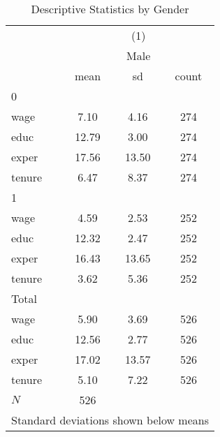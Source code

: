 \begin{table}[htbp]\centering
\def\sym#1{\ifmmode^{#1}\else\(^{#1}\)\fi}
\caption{Descriptive Statistics by Gender}\label{tab:0201-descriptives_by_gender}
\begin{tabular}{l*{1}{ccc}}
\toprule
            &\multicolumn{3}{c}{(1)}               \\
            &\multicolumn{3}{c}{Male}              \\
            &        mean&          sd&       count\\
\midrule
0           &            &            &            \\
wage        &        7.10&        4.16&         274\\
educ        &       12.79&        3.00&         274\\
exper       &       17.56&       13.50&         274\\
tenure      &        6.47&        8.37&         274\\
\midrule
1           &            &            &            \\
wage        &        4.59&        2.53&         252\\
educ        &       12.32&        2.47&         252\\
exper       &       16.43&       13.65&         252\\
tenure      &        3.62&        5.36&         252\\
\midrule
Total       &            &            &            \\
wage        &        5.90&        3.69&         526\\
educ        &       12.56&        2.77&         526\\
exper       &       17.02&       13.57&         526\\
tenure      &        5.10&        7.22&         526\\
\midrule
\(N\)       &         526&            &            \\
\bottomrule
\multicolumn{4}{l}{\footnotesize Standard deviations shown below means}\\
\end{tabular}
\end{table}
